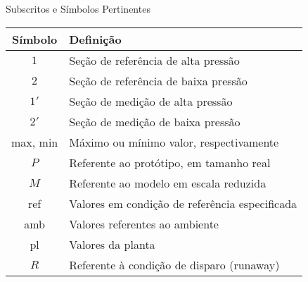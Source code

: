     \begin{frame}{Subscritos e Símbolos Pertinentes}\vspace*{-1em}

        \setlength{\tabcolsep}{2mm}
        \noindent\begin{longtable}{cp{110mm}}
            \alert{Símbolo} & \alert{Definição} \\
            \hline
            $1$ &
            Seção de referência de alta pressão \\
            $2$ &
            Seção de referência de baixa pressão \\
            $1'$ &
            Seção de medição de alta pressão \\
            $2'$ &
            Seção de medição de baixa pressão \\
            \hline
            max, min &
            Máximo ou mínimo valor, respectivamente \\
            $P$ &
            Referente ao \alert{protótipo}, em tamanho real \\
            $M$ &
            Referente ao \alert{modelo} em escala reduzida \\
            ref &
            Valores em condição de referência especificada \\
            amb &
            Valores referentes ao ambiente \\
            pl &
            Valores da planta \\
            $R$ &
            Referente à condição de \alert{disparo} (runaway) \\
            \hline
        \end{longtable}

    \end{frame}

    \begin{frame}\vspace*{0em}
    \end{frame}

